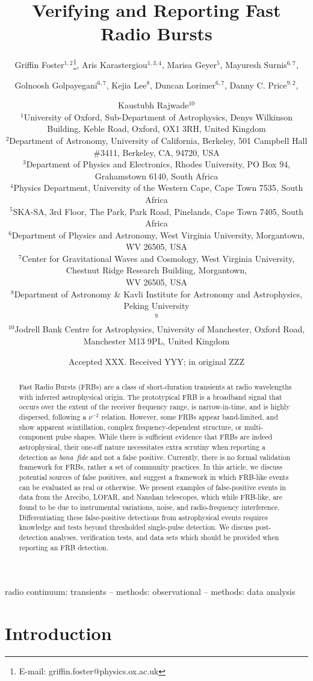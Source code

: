 \documentclass[a4paper,fleqn,usenatbib]{mnras}
\title[FRB Verification]{Verifying and Reporting Fast Radio Bursts}
\author[G. Foster et al.]{Griffin Foster$^{1,2}$\thanks{E-mail: griffin.foster@physics.ox.ac.uk},
Aris Karastergiou$^{1,3,4}$,
Marisa Geyer$^{5}$,
Mayuresh Surnis$^{6,7}$,
\and
Golnoosh Golpayegani$^{6,7}$,
Kejia Lee$^{8}$,
Duncan Lorimer$^{6,7}$,
Danny C. Price$^{9,2}$,
\and
Kaustubh Rajwade$^{10}$
\\
$^{1}$University of Oxford, Sub-Department of Astrophysics, Denys Wilkinson Building, Keble Road, Oxford, OX1 3RH, United Kingdom\\
$^{2}$Department of Astronomy, University of California, Berkeley, 501 Campbell
Hall \#3411, Berkeley, CA, 94720, USA\\
$^{3}$Department of Physics and Electronics, Rhodes University,
    PO Box 94, Grahamstown 6140, South Africa\\
$^{4}$Physics Department, University of the Western Cape,
    Cape Town 7535, South Africa\\
$^{5}$SKA-SA, 3rd Floor, The Park, Park Road, Pinelands, Cape Town 7405, South Africa\\
$^{6}$Department of Physics and Astronomy, West Virginia University, Morgantown, WV 26505, USA\\
$^{7}$Center for Gravitational Waves and Cosmology, West Virginia University, Chestnut Ridge Research Building, Morgantown,\\ WV 26505, USA\\
$^{8}$Department of Astronomy \& Kavli Institute for Astronomy and Astrophysics, Peking University\\
$^{9}$\SWIN \\
$^{10}$Jodrell Bank Centre for Astrophysics, University of Manchester, Oxford Road, Manchester M13 9PL, United Kingdom\\
}
\date{Accepted XXX. Received YYY; in original ZZZ}
\begin{document}
\label{firstpage}
\pagerange{\pageref{firstpage}--\pageref{lastpage}}
\maketitle

\begin{abstract}
Fast Radio Bursts (FRBs) are a class of short-duration transients at radio
wavelengths with inferred astrophysical origin.  The prototypical FRB is a
broadband signal that occurs over the extent of the receiver frequency range, is
narrow-in-time, and is highly dispersed, following a $\nu^{-2}$ relation.
However, some FRBs appear band-limited, and show apparent scintillation, complex
frequency-dependent structure, or multi-component pulse shapes.  While there is
sufficient evidence that FRBs are indeed astrophysical, their one-off nature
necessitates extra scrutiny when reporting a detection as \emph{bona~fide} and
not a false positive. Currently, there is no formal validation framework for
FRBs, rather a set of community practices. In this article, we discuss potential
sources of false positives, and suggest a framework in which FRB-like events can
be evaluated as real or otherwise.  We present examples of false-positive events
in data from the Arecibo, LOFAR, and Nanshan telescopes, which while FRB-like,
are found to be due to instrumental variations, noise, and radio-frequency
interference.  Differentiating these false-positive detections from
astrophysical events requires knowledge and tests beyond thresholded
single-pulse detection.  We discuss post-detection analyses, verification tests,
and data sets which should be provided when reporting an FRB detection.
\end{abstract}

\begin{keywords}
radio continuum: transients -- methods: observational -- methods: data analysis
\end{keywords}


\section{Introduction}
\label{sec:intro}
\end{document}

